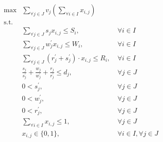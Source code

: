 
\begin{align}
    \max & \sum_{\forall j \in J} v_j \left(\sum_{\forall i \in I} x_{i,j}\right) \label{eq:objective} \\
    \mbox{s.t.} \nonumber \\
    & \sum_{\forall j \in J} s_j x_{i,j} \leq S_i, &~ \forall{i \in I} \label{eq:server-storage-constraint} \\
    & \sum_{\forall j \in J} w^{'}_j x_{i,j} \leq W_i, &~ \forall{i \in I} \label{eq:server-computation-constraint} \\
    & \sum_{\forall j \in J} (r^{'}_j + s^{'}_j) \cdot x_{i,j} \leq R_i, &~ \forall{i \in I} \label{eq:server-bandwidth-constraint} \\
    & \frac{s_j}{s^{'}_j} + \frac{w_j}{w^{'}_j} + \frac{r_j}{r^{'}_j} \leq d_j, &~ \forall{j \in J} \label{eq:task-deadline} \\
    & 0 < s^{'}_j, &~ \forall{j \in J} \label{eq:loading-speeds} \\
    & 0 < w^{'}_j, &~ \forall{j \in J} \label{eq:compute-speeds} \\
    & 0 < r^{'}_j, &~ \forall{j \in J} \label{eq:sending-speeds} \\
    & \sum_{\forall i \in I} x_{i,j} \leq 1, &~ \forall{j \in J} \label{eq:server-task-allocation} \\
    & x_{i,j} \in \{0, 1\}, &~ \forall{i \in I},\forall{j \in J} \label{eq:task-allocation}
\end{align}

